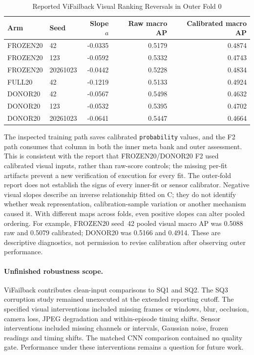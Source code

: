 \begin{table}[htbp]
\caption{Reported ViFailback Visual Ranking Reversals in Outer Fold 0}
\label{tab:vif-calibration}\centering\small
\begin{tabular}{llrrr}\toprule
Arm & Seed & Slope $a$ & Raw macro AP & Calibrated macro AP\\\midrule
FROZEN20 & 42 & -0.0335 & 0.5179 & 0.4874\\
FROZEN20 & 123 & -0.0592 & 0.5332 & 0.4743\\
FROZEN20 & 20261023 & -0.0442 & 0.5228 & 0.4834\\
FULL20 & 42 & -0.1219 & 0.5133 & 0.4924\\
DONOR20 & 42 & -0.0567 & 0.5498 & 0.4632\\
DONOR20 & 123 & -0.0532 & 0.5395 & 0.4702\\
DONOR20 & 20261023 & -0.0641 & 0.5447 & 0.4664\\
\bottomrule\end{tabular}
\end{table}

The inspected training path saves calibrated \texttt{probability} values, and the F2
path consumes that column in both the inner meta bank and outer assessment. This is
consistent with the report that FROZEN20/DONOR20 F2 used calibrated visual inputs,
rather than raw-score controls; the missing per-fit artifacts prevent a new verification
of execution for every fit. The outer-fold report does not establish the signs of every
inner-fit or sensor calibrator. Negative visual slopes describe an inverse relationship
fitted on C; they do not identify whether weak representation, calibration-sample
variation or another mechanism caused it. With different maps across folds, even
positive slopes can alter pooled ordering. For example, FROZEN20 seed~42 pooled visual
macro AP was 0.5088 raw and 0.5079 calibrated; DONOR20 was 0.5166 and 0.4914.
These are descriptive diagnostics, not permission to revise calibration after observing
outer performance.

\paragraph{Unfinished robustness scope.}
ViFailback contributes clean-input comparisons to SQ1 and SQ2. The SQ3 corruption study
remained unexecuted at the extended reporting cutoff. The specified visual interventions
included missing frames or windows, blur, occlusion, camera loss, JPEG degradation and
within-episode timing shifts. Sensor interventions included missing channels or
intervals, Gaussian noise, frozen readings and timing shifts. The matched CNN comparison
contained no quality gate. Performance under these interventions remains a question for
future work.

